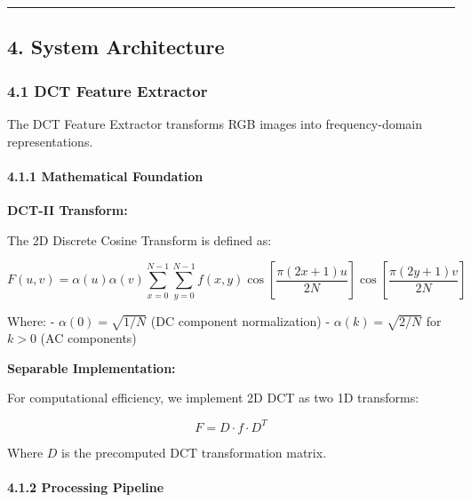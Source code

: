 \begin{center}\rule{0.5\linewidth}{0.5pt}\end{center}

\subsection{4. System Architecture}\label{system-architecture}

\subsubsection{4.1 DCT Feature Extractor}\label{dct-feature-extractor}

The DCT Feature Extractor transforms RGB images into frequency-domain
representations.

\paragraph{4.1.1 Mathematical Foundation}\label{mathematical-foundation}

\textbf{DCT-II Transform:}

The 2D Discrete Cosine Transform is defined as:

\[F(u,v) = \alpha(u)\alpha(v) \sum_{x=0}^{N-1} \sum_{y=0}^{N-1} f(x,y) \cos\left[\frac{\pi(2x+1)u}{2N}\right] \cos\left[\frac{\pi(2y+1)v}{2N}\right]\]

Where: - \(\alpha(0) = \sqrt{1/N}\) (DC component normalization) -
\(\alpha(k) = \sqrt{2/N}\) for \(k > 0\) (AC components)

\textbf{Separable Implementation:}

For computational efficiency, we implement 2D DCT as two 1D transforms:

\[F = D \cdot f \cdot D^T\]

Where \(D\) is the precomputed DCT transformation matrix.

\paragraph{4.1.2 Processing Pipeline}\label{processing-pipeline}

